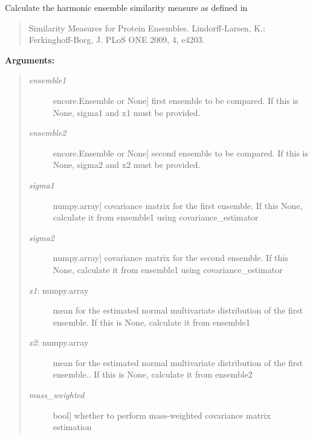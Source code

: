 \documentclass[letterpaper,10pt,english]{sphinxmanual}
\begin{document}

\begin{fulllineitems}
\label{index:encore.similarity.harmonic_ensemble_similarity}
Calculate the harmonic ensemble similarity measure
as defined in
\begin{quote}

Similarity Measures for Protein Ensembles. Lindorff-Larsen, K.; 
Ferkinghoff-Borg, J. PLoS ONE 2009, 4, e4203.
\end{quote}

\textbf{Arguments:}
\begin{quote}
\begin{description}
\item[{\emph{ensemble1}}] \leavevmode{[}encore.Ensemble or None{]}
first ensemble to be compared. If this is None, sigma1 and x1 must be provided.

\item[{\emph{ensemble2}}] \leavevmode{[}encore.Ensemble or None{]}
second ensemble to be compared. If this is None, sigma2 and x2 must be provided.

\item[{\emph{sigma1}}] \leavevmode{[}numpy.array{]}
covariance matrix for the first ensemble. If this None, calculate it from ensemble1 using covariance\_estimator

\item[{\emph{sigma2}}] \leavevmode{[}numpy.array{]}
covariance matrix for the second ensemble. If this None, calculate it from ensemble1 using covariance\_estimator

\item[{\emph{x1}: numpy.array }] \leavevmode
mean for the estimated normal multivariate distribution of the first ensemble. If this is None, calculate it from ensemble1

\item[{\emph{x2}: numpy.array}] \leavevmode
mean for the estimated normal multivariate distribution of the first ensemble.. If this is None, calculate it from ensemble2

\item[{\emph{mass\_weighted}}] \leavevmode{[}bool{]}
whether to perform mass-weighted covariance matrix estimation


\end{description}
\end{quote}
\end{fulllineitems}
\end{document}
